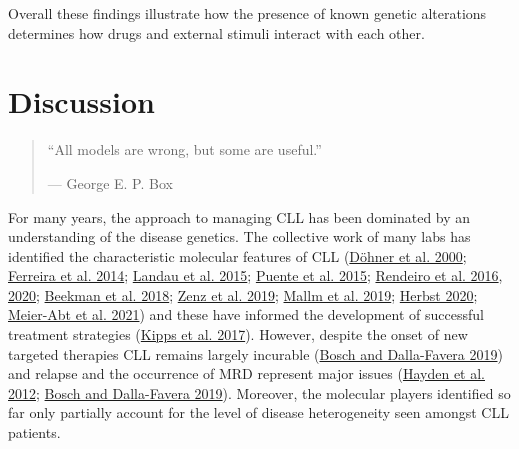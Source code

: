 \documentclass[11pt, a4paper, twosided]{book}
\begin{document}
Overall these findings illustrate how the presence of known genetic alterations determines how drugs and external stimuli interact with each other.

\hypertarget{discussion}{%
\chapter{Discussion}\label{discussion}}
\begin{quote}
``All models are wrong, but some are useful.''

\hfill --- George E. P. Box
\end{quote}
For many years, the approach to managing CLL has been dominated by an understanding of the disease genetics. The collective work of many labs has identified the characteristic molecular features of CLL (\protect\hyperlink{ref-Dohner2000}{Döhner et al. 2000}; \protect\hyperlink{ref-Ferreira2014}{Ferreira et al. 2014}; \protect\hyperlink{ref-Landau2015}{Landau et al. 2015}; \protect\hyperlink{ref-Puente2015}{Puente et al. 2015}; \protect\hyperlink{ref-Rendeiro2016}{Rendeiro et al. 2016}, \protect\hyperlink{ref-Rendeiro2020}{2020}; \protect\hyperlink{ref-Beekman2018}{Beekman et al. 2018}; \protect\hyperlink{ref-Zenz2019}{Zenz et al. 2019}; \protect\hyperlink{ref-Mallm2019}{Mallm et al. 2019}; \protect\hyperlink{ref-HerbstThesis}{Herbst 2020}; \protect\hyperlink{ref-MeierAbt2021}{Meier-Abt et al. 2021}) and these have informed the development of successful treatment strategies (\protect\hyperlink{ref-Kipps2017}{Kipps et al. 2017}). However, despite the onset of new targeted therapies CLL remains largely incurable (\protect\hyperlink{ref-Bosch2019}{Bosch and Dalla-Favera 2019}) and relapse and the occurrence of MRD represent major issues (\protect\hyperlink{ref-Hayden2012}{Hayden et al. 2012}; \protect\hyperlink{ref-Bosch2019}{Bosch and Dalla-Favera 2019}). Moreover, the molecular players identified so far only partially account for the level of disease heterogeneity seen amongst CLL patients.
\end{document}
